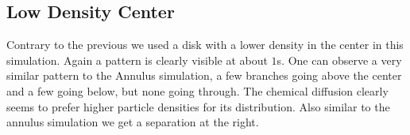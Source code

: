 \begin{minipage}{0.45\textwidth}
\subsection{Low Density Center}
Contrary to the previous we used a disk with a lower density in the center in this simulation.
Again a pattern is clearly visible at about $1$s.
One can observe a very similar pattern to the Annulus simulation, a few branches going above the center and a few going below, but none going through.
The chemical diffusion clearly seems to prefer higher particle densities for its distribution.
Also similar to the annulus simulation we get a separation at the right.
\end{minipage}